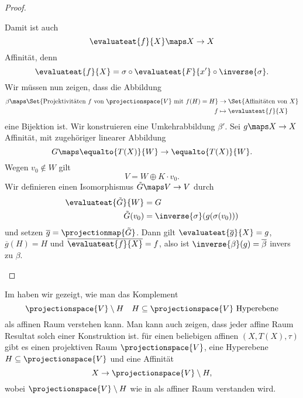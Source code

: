 \begin{proof}
\begin{proofdescription}
    Damit ist auch
    \begin{equation*}
      \evaluateat{f}{X}\maps X\to X
    \end{equation*}
    Affinität, denn
    \begin{equation*}
      \evaluateat{f}{X}=\sigma \circ \evaluateat{F}{x'}\circ \inverse{\sigma}.
    \end{equation*}
    Wir müssen nun zeigen, dass die Abbildung
    \begin{equation*}
      \begin{split}
        \beta\maps \Set{\text{Projektivitäten \( f \) von \( \projectionspace{V} \) mit \( f(H)=H \)}}&\to \Set{\text{Affinitäten von \( X \)}}\\
        f&\mapsto \evaluateat{f}{X}
      \end{split}
    \end{equation*}
    eine Bijektion ist. Wir konstruieren eine Umkehrabbildung \( \beta' \). Sei \( g\maps X\to X \) Affinität, mit zugehöriger linearer Abbildung
    \begin{equation*}
      G\maps \equalto{T(X)}{W}\to \equalto{T(X)}{W}.
    \end{equation*}
    Wegen \( v_0\not\in W \) gilt 
    \begin{equation*}
      V=W\oplus K\cdot v_0.
    \end{equation*}
    Wir definieren einen Isomorphismus \( \tilde{G}\maps V\to V \) durch
    \begin{align*}
      \evaluateat{\tilde{G}}{W}&=G\\
      \tilde{G}(v_0)&=\inverse{\sigma}(g(\sigma(v_0)))
    \end{align*}
    und setzen 
    \( \overline{g}=\projectionmap{\tilde{G}} \).
    Dann gilt 
    \( \evaluateat{\overline{g}}{X}=g \),
    \( \overline{g}(H)=H \)
     und 
     \( \overline{\evaluateat{f}{X}}=f \),
      also ist 
      \( \inverse{\beta}(g)=\overline{\beta} \) 
      invers zu \( \beta \).
  \end{proofdescription}  
\end{proof}
\begin{bemerkung*}
  Im  haben wir gezeigt, wie man das Komplement
  \begin{equation*}
    \projectionspace{V}\setminus H\quad H\subseteq \projectionspace{V}\text{ Hyperebene}
  \end{equation*}
  als affinen Raum verstehen kann. Man kann auch zeigen, dass jeder affine Raum Resultat solch einer Konstruktion ist. \Dh für einen beliebigen affinen \( (X,T(X),\tau) \) gibt es einen projektiven Raum \( \projectionspace{V} \), eine Hyperebene \( H\subseteq \projectionspace{V} \) und eine Affinität
  \begin{equation*}
    X\to \projectionspace{V}\setminus H,
  \end{equation*}
  wobei \( \projectionspace{V}\setminus H \) wie in  als affiner Raum verstanden wird. 
\end{bemerkung*}